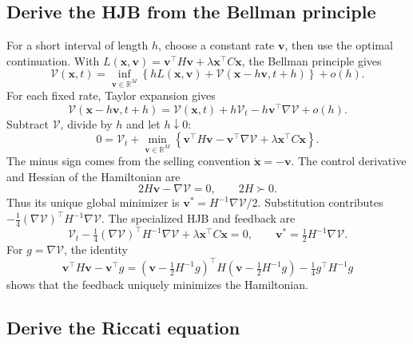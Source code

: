 \documentclass[11pt,a4paper]{article}
\begin{document}
\subsection*{Derive the HJB from the Bellman principle}

For a short interval of length $h$, choose a constant rate $\mathbf v$,
then use the optimal continuation. With
$L(\mathbf x,\mathbf v)=\mathbf v^\top H\mathbf v+
\lambda\mathbf x^\top C\mathbf x$, the Bellman principle gives
\[
 \mathcal V(\mathbf x,t)=\inf_{\mathbf v\in\mathbb R^M}
 \left\{hL(\mathbf x,\mathbf v)
 +\mathcal V(\mathbf x-h\mathbf v,t+h)\right\}+o(h).
\]
For each fixed rate, Taylor expansion gives
\[
 \mathcal V(\mathbf x-h\mathbf v,t+h)
 =\mathcal V(\mathbf x,t)+h\mathcal V_t
 -h\mathbf v^\top\nabla\mathcal V+o(h).
\]
Subtract $\mathcal V$, divide by $h$ and let $h\downarrow0$:
\begin{equation}
 0=\mathcal V_t+\min_{\mathbf v\in\mathbb R^M}
 \left\{\mathbf v^\top H\mathbf v
 -\mathbf v^\top\nabla\mathcal V+\lambda\mathbf x^\top C\mathbf x\right\}.
 \label{eq:stage2-bellman}
\end{equation}
The minus sign comes from the selling convention $\dot{\mathbf x}=-\mathbf v$.
The control derivative and Hessian of the Hamiltonian are
\[
 2H\mathbf v-\nabla\mathcal V=0,\qquad 2H\succ0.
\]
Thus its unique global minimizer is
$\mathbf v^*=H^{-1}\nabla\mathcal V/2$. Substitution contributes
$-\tfrac14(\nabla\mathcal V)^\top H^{-1}\nabla\mathcal V$.
The specialized HJB and feedback are
\begin{equation}
 \boxed{\mathcal V_t-\tfrac14(\nabla\mathcal V)^\top H^{-1}\nabla\mathcal V
 +\lambda\mathbf x^\top C\mathbf x=0,\qquad
 \mathbf v^*=\tfrac12H^{-1}\nabla\mathcal V.}
 \label{eq:pde}
\end{equation}
For $g=\nabla\mathcal V$, the identity
\[
 \mathbf v^\top H\mathbf v-\mathbf v^\top g
 =(\mathbf v-\tfrac12H^{-1}g)^\top H(\mathbf v-\tfrac12H^{-1}g)
 -\tfrac14g^\top H^{-1}g
\]
shows that the feedback uniquely minimizes the Hamiltonian.
\subsection*{Derive the Riccati equation}
\end{document}
